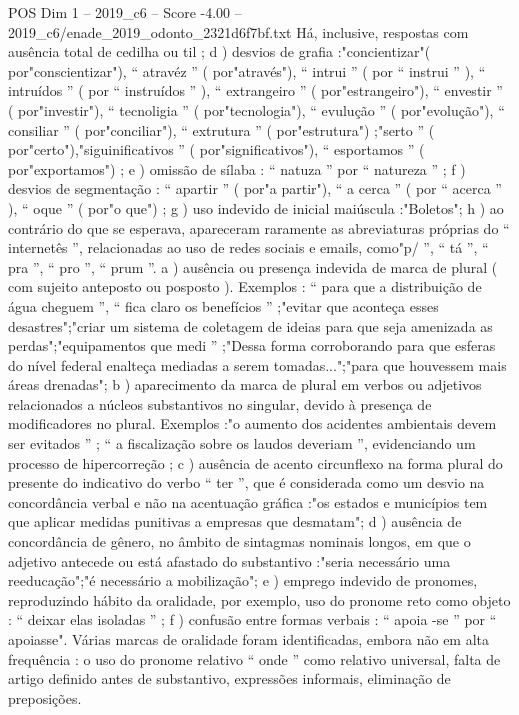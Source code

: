 \begin{textsample}{POS Dim 1 – 2019\_c6 – Score -4.00 – 2019\_c6/enade\_2019\_odonto\_2321d6f7bf.txt}
Há, inclusive, respostas com ausência total de cedilha ou til ; d ) desvios de grafia :"concientizar"( por"conscientizar"), “ atravéz ” ( por"através"), “ intrui ” ( por “ instrui ” ), “ intruídos ” ( por “ instruídos ” ), “ extrangeiro ” ( por"estrangeiro"), “ envestir ” ( por"investir"), “ tecnoligia ” ( por"tecnologia"), “ evulução ” ( por"evolução"), “ consiliar ” ( por"conciliar"), “ extrutura ” ( por"estrutura") ;"serto ” ( por"certo"),"siguinificativos ” ( por"significativos"), “ esportamos ” ( por"exportamos") ; e ) omissão de sílaba : “ natuza ” por “ natureza ” ; f ) desvios de segmentação : “ apartir ” ( por"a partir"), “ a cerca ” ( por “ acerca ” ), “ oque ” ( por"o que") ; g ) uso indevido de inicial maiúscula :"Boletos"; h ) ao contrário do que se esperava, apareceram raramente as abreviaturas próprias do “ internetês ”, relacionadas ao uso de redes sociais e emails, como"p/ ”, “ tá ”, “ pra ”, “ pro ”, “ prum ”. a ) ausência ou presença indevida de marca de plural ( com sujeito anteposto ou posposto ).
Exemplos : “ para que a distribuição de água cheguem ”, “ fica claro os benefícios ” ;"evitar que aconteça esses desastres";"criar um sistema de coletagem de ideias para que seja amenizada as perdas";"equipamentos que medi ” ;"Dessa forma corroborando para que esferas do nível federal enalteça mediadas a serem tomadas...";"para que houvessem mais áreas drenadas"; b ) aparecimento da marca de plural em verbos ou adjetivos relacionados a núcleos substantivos no singular, devido à presença de modificadores no plural.
Exemplos :"o aumento dos acidentes ambientais devem ser evitados ” ; “ a fiscalização sobre os laudos deveriam ”, evidenciando um processo de hipercorreção ; c ) ausência de acento circunflexo na forma plural do presente do indicativo do verbo “ ter ”, que é considerada como um desvio na concordância verbal e não na acentuação gráfica :"os estados e municípios tem que aplicar medidas punitivas a empresas que desmatam"; d ) ausência de concordância de gênero, no âmbito de sintagmas nominais longos, em que o adjetivo antecede ou está afastado do substantivo :"seria necessário uma reeducação";"é necessário a mobilização"; e ) emprego indevido de pronomes, reproduzindo hábito da oralidade, por exemplo, uso do pronome reto como objeto : “ deixar elas isoladas ” ; f ) confusão entre formas verbais : “ apoia -se ” por “ apoiasse".
Várias marcas de oralidade foram identificadas, embora não em alta frequência : o uso do pronome relativo “ onde ” como relativo universal, falta de artigo definido antes de substantivo, expressões informais, eliminação de preposições.

\end{textsample}
